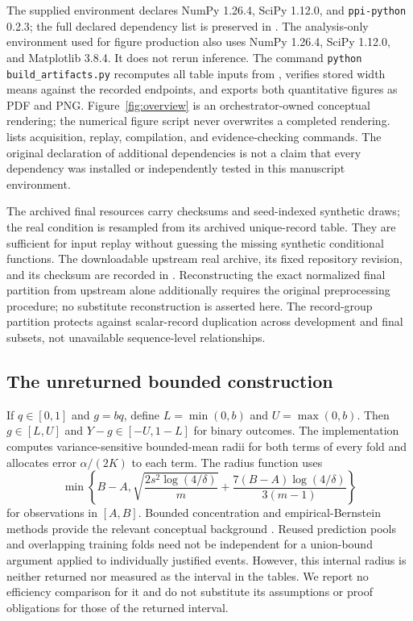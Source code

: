 \documentclass{article}
\begin{document}
The supplied environment declares NumPy 1.26.4, SciPy 1.12.0, and \texttt{ppi-python} 0.2.3; the full declared dependency list is preserved in . The analysis-only environment used for figure production also uses NumPy 1.26.4, SciPy 1.12.0, and Matplotlib 3.8.4. It does not rerun inference. The command \texttt{python build\_artifacts.py} recomputes all table inputs from , verifies stored width means against the recorded endpoints, and exports both quantitative figures as PDF and PNG. Figure~\ref{fig:overview} is an orchestrator-owned conceptual rendering; the numerical figure script never overwrites a completed rendering.  lists acquisition, replay, compilation, and evidence-checking commands. The original declaration of additional dependencies is not a claim that every dependency was installed or independently tested in this manuscript environment.

The archived final resources carry checksums and seed-indexed synthetic draws; the real condition is resampled from its archived unique-record table. They are sufficient for input replay without guessing the missing synthetic conditional functions. The downloadable upstream real archive, its fixed repository revision, and its checksum are recorded in . Reconstructing the exact normalized final partition from upstream alone additionally requires the original preprocessing procedure; no substitute reconstruction is asserted here. The record-group partition protects against scalar-record duplication across development and final subsets, not unavailable sequence-level relationships.

\subsection{The unreturned bounded construction}
If $q\in[0,1]$ and $g=bq$, define $L=\min(0,b)$ and $U=\max(0,b)$. Then $g\in[L,U]$ and $Y-g\in[-U,1-L]$ for binary outcomes. The implementation computes variance-sensitive bounded-mean radii for both terms of every fold and allocates error $\alpha/(2K)$ to each term. The radius function uses
\[
 \min\left\{B-A,
 \sqrt{\frac{2s^2\log(4/\delta)}{m}}
 +\frac{7(B-A)\log(4/\delta)}{3(m-1)}\right\}
\]
for observations in $[A,B]$. Bounded concentration and empirical-Bernstein methods provide the relevant conceptual background \citep{Hoeffding,MaurerPontil}. Reused prediction pools and overlapping training folds need not be independent for a union-bound argument applied to individually justified events. However, this internal radius is neither returned nor measured as the interval in the tables. We report no efficiency comparison for it and do not substitute its assumptions or proof obligations for those of the returned interval.
\end{document}
